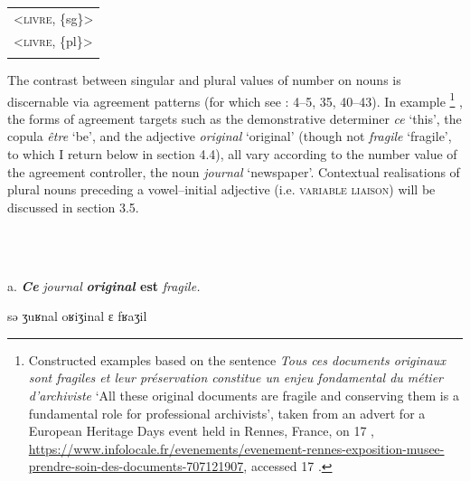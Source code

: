\documentclass[output=paper]{langscibook}
\begin{document}
\begin{tabularx}{\textwidth}{X}
\lsptoprule

<\textsc{livre}, \{sg\}>\\
<\textsc{livre}, \{pl\}>\\
\lspbottomrule
\end{tabularx}
\begin{stylelsTableHeading}%
\begin{table}
\caption{Content paradigm of Fr. \textit{livre} ‘book’.}
\label{tab:key:2}
\end{table}\end{stylelsTableHeading}

The contrast between singular and plural values of number on nouns is discernable via agreement patterns (for which see \citealt{Corbett2006}: 4–5, 35, 40–43). In example \footnote{Constructed examples based on the sentence \textit{Tous ces documents originaux sont fragiles et leur préservation constitue un enjeu fondamental du métier d’archiviste} ‘All these original documents are fragile and conserving them is a fundamental role for professional archivists’, taken from an advert for a European Heritage Days event held in Rennes, France, on 17 \citealt{September2023}, \url{https://www.infolocale.fr/evenements/evenement-rennes-exposition-musee-prendre-soin-des-documents-707121907}, accessed 17 \citealt{November2023}.} , the forms of agreement targets such as the demonstrative determiner \textit{ce} ‘this’, the copula \textit{être} ‘be’, and the adjective \textit{original} ‘original’ (though not \textit{fragile} ‘fragile’, to which I return below in section 4.4), all vary according to the number value of the agreement controller, the noun \textit{journal} ‘newspaper’. Contextual realisations of plural nouns preceding a vowel–initial adjective (i.e. \textsc{variable} \textsc{liaison}) will be discussed in section 3.5.

\ea%
    \label{ex:key:1}
    \gll \\
         \\
    \glt
    \z %

          a.   \textbf{\textit{Ce}} \textit{journal} \textbf{\textit{original}  \textbf{est} }\textit{fragile.}    

    sǝ ʒuʁnal oʁiʒinal ɛ  fʁaʒil  
\end{document}

